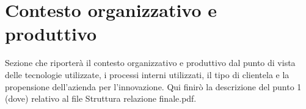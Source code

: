 \section{Contesto organizzativo e produttivo}

Sezione che riporterà il contesto organizzativo e produttivo dal punto di vista delle tecnologie utilizzate, i processi interni
utilizzati, il tipo di clientela e la propensione dell’azienda per l’innovazione.
Qui finirò la descrizione del punto 1 (dove) relativo al file Struttura relazione finale.pdf.